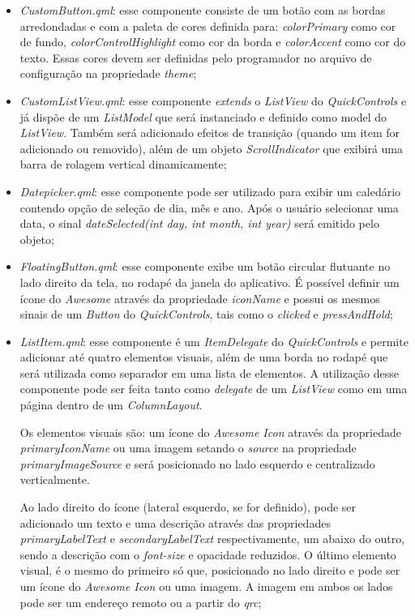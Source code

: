 \begin{itemize}
	\item \textit{CustomButton.qml}: esse componente consiste de um botão com as bordas arredondadas e com a paleta de cores definida para: \textit{colorPrimary} como cor de fundo, \textit{colorControlHighlight} como cor da borda e \textit{colorAccent} como cor do texto. Essas cores devem ser definidas pelo programador no arquivo de configuração na propriedade \textit{theme};

	\item \textit{CustomListView.qml}: esse componente \textit{extends} o \textit{ListView} do \textit{QuickControls} e já dispõe de um \textit{ListModel} que será instanciado e definido como model do \textit{ListView}. Também será adicionado efeitos de transição (quando um item for adicionado ou removido), além de um objeto \textit{ScrollIndicator} que exibirá uma barra de rolagem vertical dinamicamente;

	\item \textit{Datepicker.qml}: esse componente pode ser utilizado para exibir um caledário contendo opção de seleção de dia, mês e ano. Após o usuário selecionar uma data, o sinal \textit{dateSelected(int day, int month, int year)} será emitido pelo objeto;

	\item \textit{FloatingButton.qml}: esse componente exibe um botão circular flutuante no lado direito da tela, no rodapé da janela do aplicativo. É possível definir um ícone do \textit{Awesome} através da propriedade \textit{iconName} e possui os mesmos sinais de um \textit{Button} do \textit{QuickControls}, tais como o \textit{clicked} e \textit{pressAndHold};

	\item \textit{ListItem.qml}: esse componente é um \textit{ItemDelegate} do \textit{QuickControls} e permite adicionar até quatro elementos visuais, além de uma borda no rodapé que será utilizada como separador em uma lista de elementos. A utilização desse componente pode ser feita tanto como \textit{delegate} de um \textit{ListView} como em uma página dentro de um \textit{ColumnLayout}.\par
	Os elementos visuais são: um ícone do \textit{Awesome Icon} através da propriedade \textit{primaryIconName} ou uma imagem setando o \textit{source} na propriedade \textit{primaryImageSource} e será posicionado no lado esquerdo e centralizado verticalmente.\par
	Ao lado direito do ícone (lateral esquerdo, se for definido), pode ser adicionado um texto e uma descrição através das propriedades \textit{primaryLabelText} e \textit{secondaryLabelText} respectivamente, um abaixo do outro, sendo a descrição com o \textit{font-size} e opacidade reduzidos. O último elemento visual, é o mesmo do primeiro só que, posicionado no lado direito e pode ser um ícone do \textit{Awesome Icon} ou uma imagem. A imagem em ambos os lados pode ser um endereço remoto ou a partir do \textit{qrc};


\end{itemize}
